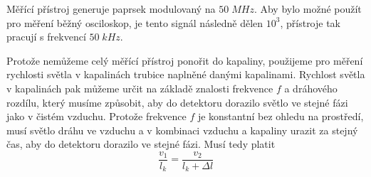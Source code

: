\documentclass{article}
\begin{document}
Měřící přístroj generuje paprsek modulovaný na \(50\;MHz\).
Aby bylo možné použít pro měření běžný osciloskop, je tento signál následně dělen \(10^{3}\), přístroje tak pracují s frekvencí \(50\;kHz\).

Protože nemůžeme celý měřící přístroj ponořit do kapaliny, použijeme pro měření rychlosti světla v kapalinách trubice naplněné danými kapalinami.
Rychlost světla v kapalinách pak můžeme určit na základě znalosti frekvence \(f\) a dráhového rozdílu, který musíme způsobit, aby do detektoru dorazilo světlo ve stejné fázi jako v čistém vzduchu.
Protože frekvence \(f\) je konstantní bez ohledu na prostředí, musí světlo dráhu ve vzduchu a v kombinaci vzduchu a kapaliny urazit za stejný čas, aby do detektoru dorazilo ve stejné fázi. Musí tedy platit
\begin{equation}
    \frac{v_{1}}{l_k}=\frac{v_{2}}{l_k+\Delta l}
    \label{k-v}
\end{equation}


\newpage
\end{document}
